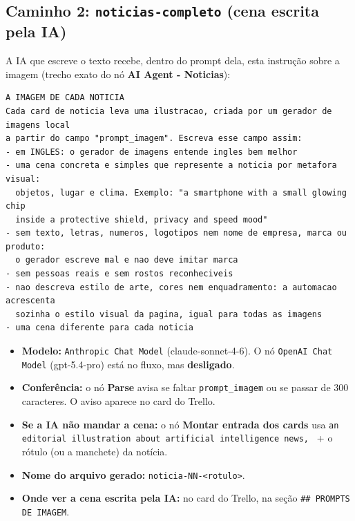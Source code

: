 \subsection*{Caminho 2: \nolinkurl{noticias-completo} (cena escrita pela IA)}

A IA que escreve o texto recebe, dentro do prompt dela, esta instrução sobre a imagem (trecho exato do nó \textbf{AI Agent - Noticias}):

\begin{lstlisting}
A IMAGEM DE CADA NOTICIA
Cada card de noticia leva uma ilustracao, criada por um gerador de imagens local
a partir do campo "prompt_imagem". Escreva esse campo assim:
- em INGLES: o gerador de imagens entende ingles bem melhor
- uma cena concreta e simples que represente a noticia por metafora visual:
  objetos, lugar e clima. Exemplo: "a smartphone with a small glowing chip
  inside a protective shield, privacy and speed mood"
- sem texto, letras, numeros, logotipos nem nome de empresa, marca ou produto:
  o gerador escreve mal e nao deve imitar marca
- sem pessoas reais e sem rostos reconheciveis
- nao descreva estilo de arte, cores nem enquadramento: a automacao acrescenta
  sozinha o estilo visual da pagina, igual para todas as imagens
- uma cena diferente para cada noticia
\end{lstlisting}

\begin{itemize}
\item 
\textbf{Modelo:} \texttt{Anthropic Chat Model} (claude-sonnet-4-6). O nó \texttt{OpenAI Chat Model} (gpt-5.4-pro) está no fluxo, mas \textbf{desligado}.


\item 
\textbf{Conferência:} o nó \textbf{Parse} avisa se faltar \nolinkurl{prompt_imagem} ou se passar de 300 caracteres. O aviso aparece no card do Trello.


\item 
\textbf{Se a IA não mandar a cena:} o nó \textbf{Montar entrada dos cards} usa \texttt{an editorial illustration about artificial intelligence news, } + o rótulo (ou a manchete) da notícia.


\item 
\textbf{Nome do arquivo gerado:} \nolinkurl{noticia-NN-<rotulo>}.


\item 
\textbf{Onde ver a cena escrita pela IA:} no card do Trello, na seção \texttt{\#\# PROMPTS DE IMAGEM}.


\end{itemize}

